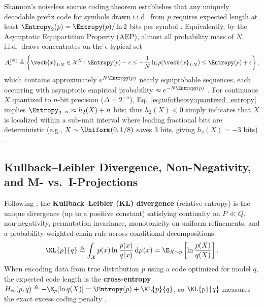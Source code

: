 \documentclass[../../../../master.tex]{subfiles}
\begin{document}
\begin{intuition}
\label{int:infotheory:typical}
Shannon's noiseless source coding theorem establishes that any uniquely decodable prefix code for symbols drawn i.i.d.\ from $p$ requires expected length at least $\Entropy_2(p) = \Entropy(p)/\ln 2$ bits per symbol  . Equivalently, by the Asymptotic Equipartition Property (AEP), almost all probability mass of $N$ i.i.d.\ draws concentrates on the $\epsilon$-typical set
\begin{equation}
\label{eq:infotheory:typical_set}
  A_\epsilon^{(N)} \triangleq \left\{ \vecb{x}_{1:N} \in \mathcal{X}^N : \Entropy(p) - \epsilon \le -\frac{1}{N}\ln p(\vecb{x}_{1:N}) \le \Entropy(p) + \epsilon \right\},
\end{equation}
which contains approximately $e^{N \Entropy(p)}$ nearly equiprobable sequences, each occurring with asymptotic empirical probability $\approx e^{-N \Entropy(p)}$ . For continuous $X$ quantized to $n$-bit precision ($\Delta = 2^{-n}$), Eq.~\eqref{eq:infotheory:quantized_entropy} implies $\Entropy_{2^{-n}} \approx h_2(X) + n$ bits; thus $h_2(X) < 0$ simply indicates that $X$ is localized within a sub-unit interval where leading fractional bits are deterministic (e.g., $X \sim \Uniform(0, 1/8)$ saves $3$ bits, giving $h_2(X) = -3$ bits) .
\end{intuition}

\subsection{Kullback--Leibler Divergence, Non-Negativity, and M- vs.\ I-Projections}

Following , the \textbf{Kullback--Leibler (KL) divergence} (relative entropy) is the unique divergence (up to a positive constant) satisfying continuity on $P \ll Q$, non-negativity, permutation invariance, monotonicity on uniform refinements, and a probability-weighted chain rule across conditional decompositions:
\begin{equation}
\label{eq:infotheory:kl_def}
  \KL{p}{q} \triangleq \int_{\mathcal{X}} p(x) \ln \frac{p(x)}{q(x)}\,\mathrm{d}\mu(x) = \E_{X \sim p}\left[\ln \frac{p(X)}{q(X)}\right].
\end{equation}
When encoding data from true distribution $p$ using a code optimized for model $q$, the expected code length is the \textbf{cross-entropy} $H_{\mathrm{ce}}(p, q) \triangleq -\E_p[\ln q(X)] = \Entropy(p) + \KL{p}{q}$, so $\KL{p}{q}$ measures the exact excess coding penalty  .
\end{document}
